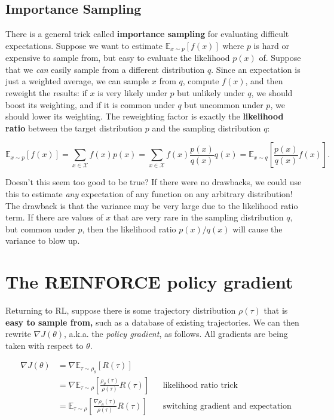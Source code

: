 \documentclass[
  letterpaper,
  DIV=11,
  numbers=noendperiod]{scrreprt}
\theoremstyle{plain}
\theoremstyle{plain}
\theoremstyle{definition}
\theoremstyle{definition}
\theoremstyle{remark}
\begin{document}
\subsection{Importance Sampling}\label{sec-importance_sampling}

There is a general trick called \textbf{importance sampling} for
evaluating difficult expectations. Suppose we want to estimate
\(\mathbb{E}_{x \sim p}[f(x)]\) where \(p\) is hard or expensive to
sample from, but easy to evaluate the likelihood \(p(x)\) of. Suppose
that we \emph{can} easily sample from a different distribution \(q\).
Since an expectation is just a weighted average, we can sample \(x\)
from \(q\), compute \(f(x)\), and then reweight the results: if \(x\) is
very likely under \(p\) but unlikely under \(q\), we should boost its
weighting, and if it is common under \(q\) but uncommon under \(p\), we
should lower its weighting. The reweighting factor is exactly the
\textbf{likelihood ratio} between the target distribution \(p\) and the
sampling distribution \(q\):

\[
\mathbb{E}_{x \sim p}[f(x)] = \sum_{x \in \mathcal{X}} f(x) p(x) = \sum_{x \in \mathcal{X}} f(x) \frac{p(x)}{q(x)} q(x) = \mathbb{E}_{x \sim q} \left[ \frac{p(x)}{q(x)} f(x) \right].
\]

Doesn't this seem too good to be true? If there were no drawbacks, we
could use this to estimate \emph{any} expectation of any function on any
arbitrary distribution! The drawback is that the variance may be very
large due to the likelihood ratio term. If there are values of \(x\)
that are very rare in the sampling distribution \(q\), but common under
\(p\), then the likelihood ratio \(p(x)/q(x)\) will cause the variance
to blow up.

\section{The REINFORCE policy
gradient}\label{the-reinforce-policy-gradient}

Returning to RL, suppose there is some trajectory distribution
\(\rho(\tau)\) that is \textbf{easy to sample from,} such as a database
of existing trajectories. We can then rewrite \(\nabla J(\theta)\),
a.k.a. the \emph{policy gradient}, as follows. All gradients are being
taken with respect to \(\theta\).

\[
\begin{aligned}
    \nabla J(\theta) & = \nabla \mathbb{E}_{\tau \sim \rho_\theta} [ R(\tau) ]                                                                                         \\
                     & = \nabla \mathbb{E}_{\tau \sim \rho} \left[ \frac{\rho_\theta(\tau)}{\rho(\tau)} R(\tau) \right] &  & \text{likelihood ratio trick}             \\
                     & = \mathbb{E}_{\tau \sim \rho} \left[ \frac{\nabla \rho_\theta(\tau)}{\rho(\tau)} R(\tau) \right] &  & \text{switching gradient and expectation}
\end{aligned}
\]
\end{document}
